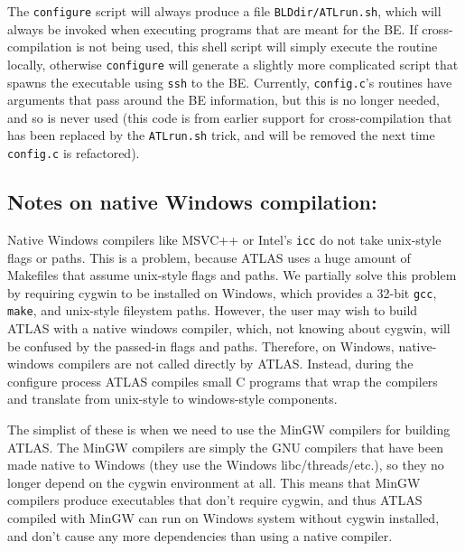 \documentclass[11pt]{article}
\begin{document}
The {\tt configure} script will always produce a file {\tt BLDdir/ATLrun.sh},
which will always be invoked when executing programs that are meant for
the BE.  If cross-compilation is not being used, this shell script will
simply execute the routine locally, otherwise {\tt configure} will
generate a slightly more complicated script that spawns the executable
using {\tt ssh} to the BE.  Currently, {\tt config.c}'s routines have
arguments that pass around the BE information, but this is no longer 
needed, and so is never used (this code is from earlier support for
cross-compilation that has been replaced by the {\tt ATLrun.sh} trick,
and will be removed the next time {\tt config.c} is refactored).

\subsection{Notes on native Windows compilation:}
Native Windows compilers like MSVC++ or Intel's {\tt icc} do not take
unix-style flags or paths.  This is a problem, because ATLAS uses
a huge amount of Makefiles that assume unix-style flags and paths.
We partially solve this problem by requiring cygwin to be installed
on Windows, which provides a 32-bit {\tt gcc}, {\tt make}, and
unix-style fileystem paths.  However, the user may wish to build
ATLAS with a native windows compiler, which, not knowing about cygwin,
will be confused by the passed-in flags and paths.   Therefore, on
Windows, native-windows compilers are not called directly by ATLAS.
Instead, during the configure process ATLAS compiles small C programs
that wrap the compilers and translate from unix-style to windows-style
components.

The simplist of these is when we need to use the MinGW compilers for
building ATLAS.  The MinGW compilers are simply the GNU compilers that
have been made native to Windows (they use the Windows libc/threads/etc.),
so they no longer depend on the cygwin environment at all.  This means
that MinGW compilers produce executables that don't require cygwin,
and thus ATLAS compiled with MinGW can run on Windows system without
cygwin installed, and don't cause any more dependencies than using a
native compiler.
\end{document}

